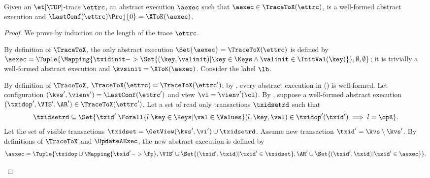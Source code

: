 \begin{toappendix}
\label{sec:et-trace-aexec-well-formed}
\end{toappendix}
\begin{theoremrep}
\label{prop:et-trace-to-well-formed-aexec}
\label{thm:et-trace-to-well-formed-aexec}
Given an {\(\et[\TOP]\)}-trace \( \ettrc \), an abstract execution \( \aexec \) 
such that \( \aexec \in \TraceToX(\ettrc) \), is a well-formed abstract execution
and \( \LastConf(\ettrc)\Proj{0} = \XToK(\aexec) \).
\end{theoremrep}
\begin{proof}
We prove by induction on the length of the trace \( \ettrc \).
\begin{enumerate}
\CaseBase{\( \ettrc = \ToRed{\kvsinit | \vienvinit } \)}
    By definition of \( \TraceToX \), the only abstract execution \( \Set{\aexec} = \TraceToX(\ettrc) \)
    is defined by \( \aexec = \Tuple{\Mapping{\txidinit
                        -> \Set{(\key,\valinit) | \key \in \Keys \land  \valinit \in \InitVal(\key) } }
        , \emptyset, \emptyset} \);
    it is trivially a well-formed abstract execution and \( \kvsinit = \XToK(\aexec)\).
    Consider the label \( \lb \).
    \begin{enumerate}
    \Case{\( \lb = \lbView{\vi}\)}
        By definition of \(\TraceToX\), \( \TraceToX(\ettrc) = \TraceToX(\ettrc') \);
        by \ih, every abstract execution in \TraceToX(\ettrc) is well-formed.
    \Case{\( \lb = \lbTrans{\fp}\)}
        Let configuration \( (\kvs',\vienv') = \LastConf(\ettrc') \) 
        and view \( \vi = \vienv'(\cl)\).
        By \ih, suppose a well-formed abstract execution \( (\txidop',\VIS',\AR') \in \TraceToX(\ettrc') \).
        Let a set of read only transactions \( \txidsetrd \) such that 
        \[
            \txidsetrd \subseteq 
            \Set{ \txid' | \Forall{l | \key \in \Keys | \val \in \Values } 
                    (l,\key,\val) \in \txidop'(\txid') \implies l = \opR } .
        \]
        Let the set of visible transactions \( \txidset = \GetView(\kvs',\vi') \cup \txidsetrd \).
        Assume new transaction \( \txid' = \kvs \setminus \kvs' \).
        By definitions of \( \TraceToX \) and \( \UpdateAExec \), the new abstract execution is defined by
        \[
            \aexec = \Tuple{\txidop \cup \Mapping{\txid' -> \fp }
            , \VIS' \cup \Set{(\txid',\txid) | \txid' \in \txidset }
            , \AR' \cup \Set{(\txid',\txid) | \txid' \in \aexec } } .
\]
\end{enumerate}
\end{enumerate}
\end{proof}
